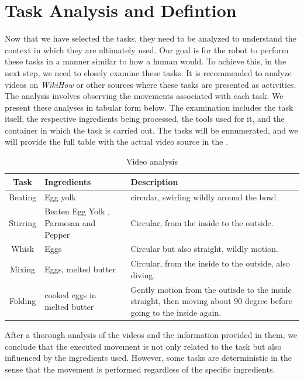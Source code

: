 \section{Task Analysis and Defintion}
\label{sec:task_analysis}
Now that we have selected the tasks, they need to be analyzed to understand the context in which they are ultimately used. 
Our goal is for the robot to perform these tasks in a manner similar to how a human would. 
To achieve this, in the next step, we need to closely examine these tasks. 
It is recommended to analyze videos on \textit{WikiHow} \cite{wikihow} or other sources where these tasks are presented as activities. 
The analysis involves observing the movements associated with each task. 
We present these analyses in tabular form below. The examination includes the task itself, the respective ingredients being processed, the tools used for it, and the container in which the task is carried out.
The tasks will be ennumerated, and we will provide the full table with the actual video source in the .
    \begin{table}[H]
    \centering
    \begin{tabular}{|c|p{}|p{}|}
        \hline
        \textbf{Task} &  \textbf{Ingredients} & \textbf{Description} \\
        \hline
        Beating &  Egg yolk & circular, swirling wildly around the bowl \\
        \hline
        Stirring & Beaten Egg Yolk , Parmesan and Pepper  & Circular, from the inside to the outside. \\
        \hline
        Whisk & Eggs  & Circular but also straight, wildly motion. \\
        \hline
        Mixing &  Eggs, melted butter & Circular, from the inside to the outside, also diving. \\
        \hline
        Folding & cooked eggs in melted butter & Gently motion from the outisde to the inside straight, then moving about 90 degree before going to the inside again. \\
        \hline
      \end{tabular}
    \caption{Video analysis}
    \label{tab:videoanalysis}
  \end{table}


After a thorough analysis of the videos and the information provided in them, we conclude that the executed movement is not only related to the task but also influenced by the ingredients used. However, some tasks are deterministic in the sense that the movement is performed regardless of the specific ingredients.

